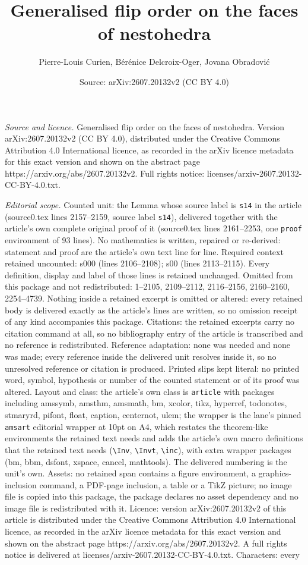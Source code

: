 \documentclass[10pt,a4paper]{amsart}
\title[Generalised flip order on the faces of nestohedra]{Generalised flip order on the faces of nestohedra}
\author{Pierre-Louis Curien, B\'er\'enice Delcroix-Oger, Jovana Obradovi\'c}
\date{Source: arXiv:2607.20132v2 (CC BY 4.0)}
\begin{document}
\maketitle

\noindent\emph{Source and licence.} Generalised flip order on the faces of nestohedra. Version arXiv:2607.20132v2 (CC BY 4.0), distributed under the Creative Commons Attribution 4.0 International licence, as recorded in the arXiv licence metadata for this exact version and shown on the abstract page https://arxiv.org/abs/2607.20132v2. Full rights notice: licenses/arxiv-2607.20132-CC-BY-4.0.txt.\par\smallskip

\noindent\textit{Editorial scope.} Counted unit: the Lemma whose source label is \texttt{s14} in the article (source0.tex lines 2157--2159, source label \texttt{s14}), delivered together with the article's own complete original proof of it (source0.tex lines 2161--2253, one \texttt{proof} environment of 93 lines). No mathematics is written, repaired or re-derived: statement and proof are the article's own text line for line. Required context retained uncounted: s000 (lines 2106--2108); s00 (lines 2113--2115). Every definition, display and label of those lines is retained unchanged. Omitted from this package and not redistributed: 1--2105, 2109--2112, 2116--2156, 2160--2160, 2254--4739. Nothing inside a retained excerpt is omitted or altered: every retained body is delivered exactly as the article's lines are written, so no omission receipt of any kind accompanies this package. Citations: the retained excerpts carry no citation command at all, so no bibliography entry of the article is transcribed and no reference is redistributed. Reference adaptation: none was needed and none was made; every reference inside the delivered unit resolves inside it, so no unresolved reference or citation is produced. Printed slips kept literal: no printed word, symbol, hypothesis or number of the counted statement or of its proof was altered. Layout and class: the article's own class is \texttt{article} with packages including amssymb, amsthm, amsmath, bm, xcolor, tikz, hyperref, todonotes, stmaryrd, pifont, float, caption, centernot, ulem; the wrapper is the lane's pinned \texttt{amsart} editorial wrapper at 10pt on A4, which restates the theorem-like environments the retained text needs and adds the article's own macro definitions that the retained text needs (\texttt{\textbackslash Inv}, \texttt{\textbackslash Invt}, \texttt{\textbackslash inc}), with extra wrapper packages (bm, bbm, dsfont, xspace, cancel, mathtools). The delivered numbering is the unit's own. Assets: no retained span contains a figure environment, a graphics-inclusion command, a PDF-page inclusion, a table or a TikZ picture; no image file is copied into this package, the package declares no asset dependency and no image file is redistributed with it. Licence: version arXiv:2607.20132v2 of this article is distributed under the Creative Commons Attribution 4.0 International licence, as recorded in the arXiv licence metadata for this exact version and shown on the abstract page https://arxiv.org/abs/2607.20132v2. A full rights notice is delivered at licenses/arxiv-2607.20132-CC-BY-4.0.txt. Characters: every 
\end{document}
